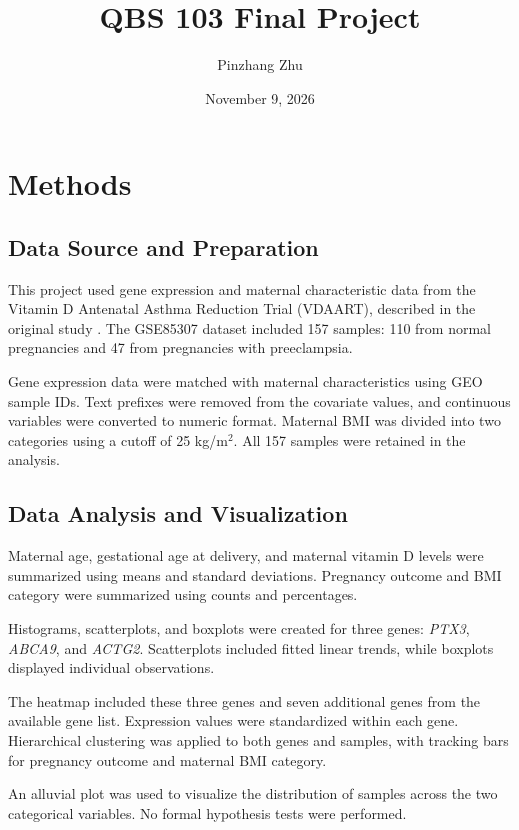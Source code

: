 \documentclass[11pt]{article}
\title{QBS 103 Final Project}
\author{Pinzhang Zhu}
\date{November 9, 2026}
\begin{document}
\maketitle

\section{Methods}
\subsection{Data Source and Preparation}

This project used gene expression and maternal characteristic data from the Vitamin D Antenatal Asthma Reduction Trial (VDAART), described in the original study \cite{mirzakhani_early_2016}. The GSE85307 dataset included 157 samples: 110 from normal pregnancies and 47 from pregnancies with preeclampsia.

Gene expression data were matched with maternal characteristics using GEO sample IDs. Text prefixes were removed from the covariate values, and continuous variables were converted to numeric format. Maternal BMI was divided into two categories using a cutoff of 25 kg/m$^2$. All 157 samples were retained in the analysis.

\subsection{Data Analysis and Visualization}

Maternal age, gestational age at delivery, and maternal vitamin D levels were summarized using means and standard deviations. Pregnancy outcome and BMI category were summarized using counts and percentages.

Histograms, scatterplots, and boxplots were created for three genes: \textit{PTX3}, \textit{ABCA9}, and \textit{ACTG2}. Scatterplots included fitted linear trends, while boxplots displayed individual observations.

The heatmap included these three genes and seven additional genes from the available gene list. Expression values were standardized within each gene. Hierarchical clustering was applied to both genes and samples, with tracking bars for pregnancy outcome and maternal BMI category.

An alluvial plot was used to visualize the distribution of samples across the two categorical variables. No formal hypothesis tests were performed.
\end{document}

